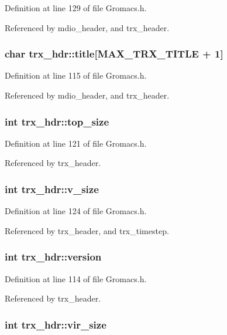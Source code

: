 Definition at line 129 of file Gromacs.h.

Referenced by mdio\_\-header, and trx\_\-header.
\subsubsection{\setlength{\rightskip}{0pt plus 5cm}char trx\_\-hdr::title[MAX\_\-TRX\_\-TITLE + 1]}\label{structtrx__hdr_m1}




Definition at line 115 of file Gromacs.h.

Referenced by mdio\_\-header, and trx\_\-header.
\subsubsection{\setlength{\rightskip}{0pt plus 5cm}int trx\_\-hdr::top\_\-size}\label{structtrx__hdr_m7}




Definition at line 121 of file Gromacs.h.

Referenced by trx\_\-header.
\subsubsection{\setlength{\rightskip}{0pt plus 5cm}int trx\_\-hdr::v\_\-size}\label{structtrx__hdr_m10}




Definition at line 124 of file Gromacs.h.

Referenced by trx\_\-header, and trx\_\-timestep.
\subsubsection{\setlength{\rightskip}{0pt plus 5cm}int trx\_\-hdr::version}\label{structtrx__hdr_m0}




Definition at line 114 of file Gromacs.h.

Referenced by trx\_\-header.
\subsubsection{\setlength{\rightskip}{0pt plus 5cm}int trx\_\-hdr::vir\_\-size}\label{structtrx__hdr_m5}





